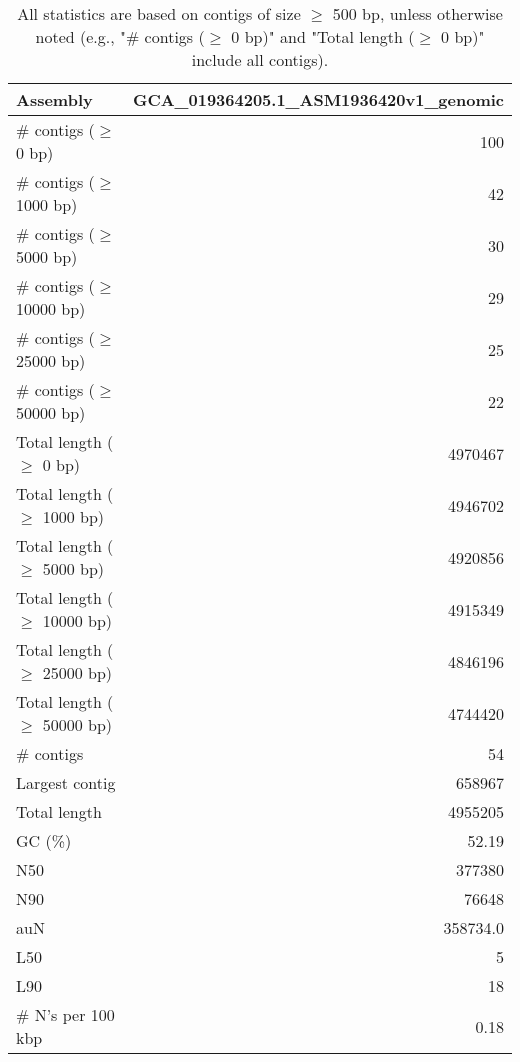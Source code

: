 \documentclass[12pt,a4paper]{article}
\begin{document}
\begin{table}[ht]
\begin{center}
\caption{All statistics are based on contigs of size $\geq$ 500 bp, unless otherwise noted (e.g., "\# contigs ($\geq$ 0 bp)" and "Total length ($\geq$ 0 bp)" include all contigs).}
\begin{tabular}{|l*{1}{|r}|}
\hline
Assembly & GCA\_019364205.1\_ASM1936420v1\_genomic \\ \hline
\# contigs ($\geq$ 0 bp) & 100 \\ \hline
\# contigs ($\geq$ 1000 bp) & 42 \\ \hline
\# contigs ($\geq$ 5000 bp) & 30 \\ \hline
\# contigs ($\geq$ 10000 bp) & 29 \\ \hline
\# contigs ($\geq$ 25000 bp) & 25 \\ \hline
\# contigs ($\geq$ 50000 bp) & 22 \\ \hline
Total length ($\geq$ 0 bp) & 4970467 \\ \hline
Total length ($\geq$ 1000 bp) & 4946702 \\ \hline
Total length ($\geq$ 5000 bp) & 4920856 \\ \hline
Total length ($\geq$ 10000 bp) & 4915349 \\ \hline
Total length ($\geq$ 25000 bp) & 4846196 \\ \hline
Total length ($\geq$ 50000 bp) & 4744420 \\ \hline
\# contigs & 54 \\ \hline
Largest contig & 658967 \\ \hline
Total length & 4955205 \\ \hline
GC (\%) & 52.19 \\ \hline
N50 & 377380 \\ \hline
N90 & 76648 \\ \hline
auN & 358734.0 \\ \hline
L50 & 5 \\ \hline
L90 & 18 \\ \hline
\# N's per 100 kbp & 0.18 \\ \hline
\end{tabular}
\end{center}
\end{table}
\end{document}
